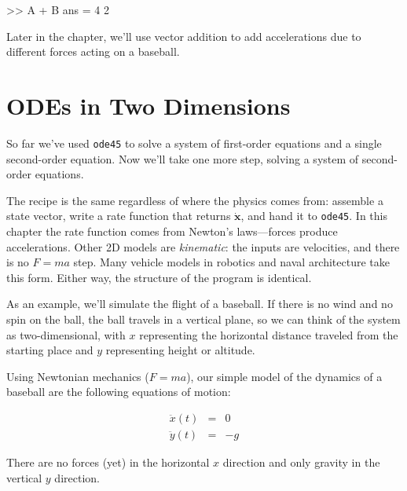 \documentclass[../../book.tex]{subfiles}
\begin{document}
\begin{code}
>> A + B
ans = 4     2
\end{code}

Later in the chapter, we'll use vector addition to add accelerations due to different forces acting on a baseball.


\section{ODEs in Two Dimensions}
\label{projectile}

So far we've used \lstinline{ode45} to solve a system of first-order equations and a single second-order equation.  Now we'll take one more step, solving a system  of second-order equations.

The recipe is the same regardless of where the physics comes from: assemble a state vector, write a rate function that returns $\dot{\mathbf{x}}$, and hand it to \lstinline{ode45}.  In this chapter the rate function comes from Newton's laws---forces produce accelerations.  Other 2D models are \emph{kinematic}: the inputs are velocities, and there is no $F=ma$ step.  Many vehicle models in robotics and naval architecture take this form.  Either way, the structure of the program is identical.

As an example, we'll simulate the flight of a baseball.
If there is no wind and no spin on the ball, the ball travels in a vertical plane, so we can think of the system as two-dimensional, with $x$ representing the horizontal distance
traveled from the starting place and $y$ representing height or altitude.


Using Newtonian mechanics ($F=ma$), our simple model of the dynamics of a baseball are the following equations of motion:

\begin{eqnarray*}
    \ddot{x}(t) &=& 0 \\
    \ddot{y}(t) &=& -g
\end{eqnarray*}

There are no forces (yet) in the horizontal $x$ direction and only gravity in the vertical $y$ direction.
\end{document}
